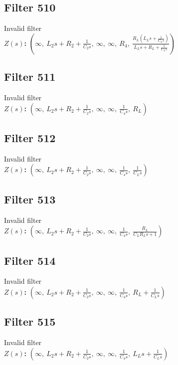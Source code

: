\documentclass{article}
\begin{document}
\subsection*{Filter 510}
Invalid filter \\ 
\textbf{$Z(s)$:} $\left( \infty, \  L_{2} s + R_{2} + \frac{1}{C_{2} s}, \  \infty, \  \infty, \  R_{4}, \  \frac{R_{L} \left(L_{L} s + \frac{1}{C_{L} s}\right)}{L_{L} s + R_{L} + \frac{1}{C_{L} s}}\right)$ \\ 
\subsection*{Filter 511}
Invalid filter \\ 
\textbf{$Z(s)$:} $\left( \infty, \  L_{2} s + R_{2} + \frac{1}{C_{2} s}, \  \infty, \  \infty, \  \frac{1}{C_{4} s}, \  R_{L}\right)$ \\ 
\subsection*{Filter 512}
Invalid filter \\ 
\textbf{$Z(s)$:} $\left( \infty, \  L_{2} s + R_{2} + \frac{1}{C_{2} s}, \  \infty, \  \infty, \  \frac{1}{C_{4} s}, \  \frac{1}{C_{L} s}\right)$ \\ 
\subsection*{Filter 513}
Invalid filter \\ 
\textbf{$Z(s)$:} $\left( \infty, \  L_{2} s + R_{2} + \frac{1}{C_{2} s}, \  \infty, \  \infty, \  \frac{1}{C_{4} s}, \  \frac{R_{L}}{C_{L} R_{L} s + 1}\right)$ \\ 
\subsection*{Filter 514}
Invalid filter \\ 
\textbf{$Z(s)$:} $\left( \infty, \  L_{2} s + R_{2} + \frac{1}{C_{2} s}, \  \infty, \  \infty, \  \frac{1}{C_{4} s}, \  R_{L} + \frac{1}{C_{L} s}\right)$ \\ 
\subsection*{Filter 515}
Invalid filter \\ 
\textbf{$Z(s)$:} $\left( \infty, \  L_{2} s + R_{2} + \frac{1}{C_{2} s}, \  \infty, \  \infty, \  \frac{1}{C_{4} s}, \  L_{L} s + \frac{1}{C_{L} s}\right)$ \\ 
\end{document}
